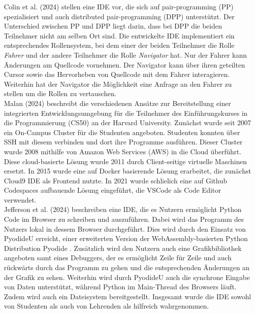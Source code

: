 Colin et al. (2024)
stellen eine IDE vor, die sich auf pair-programming (PP) spezialisiert und auch distributed pair-programming (DPP) unterstützt. Der Unterschied zwischen PP und DPP liegt darin, dass bei DPP die beiden Teilnehmer nicht am selben Ort sind. Die entwickelte IDE implementiert ein entsprechendes Rollensystem, bei dem einer der beiden Teilnehmer die Rolle \textit{Fahrer} und der andere Teilnehmer die Rolle \textit{Navigator} hat. Nur der Fahrer kann Änderungen am Quellcode vornehmen. Der Navigator kann über ihren geteilten Cursor sowie das Hervorheben von Quellcode mit dem Fahrer interagieren. Weiterhin hat der Navigator die Möglichkeit eine Anfrage an den Fahrer zu stellen um die Rollen zu vertauschen. \\

Malan (2024)
beschreibt die verschiedenen Ansätze zur Bereitstellung einer integrierten Entwicklungsumgebung für die Teilnehmer des Einführungskurses in die Programmierung (CS50) an der Harvard University. Zunächst wurde seit 2007 ein On-Campus Cluster für die Studenten angeboten. Studenten konnten über SSH mit diesem verbinden und dort ihre Programme ausführen. Dieser Cluster wurde 2008 mithilfe von Amazon Web Services (AWS)
in die Cloud überführt. Diese cloud-basierte Lösung wurde 2011 durch Client-seitige virtuelle Maschinen ersetzt. In 2015 wurde eine auf Docker basierende Lösung erarbeitet, die zunächst Cloud9 IDE
als Frontend nutzte. In 2021 wurde schlielich eine auf Github Codespaces aufbauende Lösung eingeführt, die VSCode als Code Editor verwendet. \\

Jefferson et al. (2024) \cite{PyodideU-2024} beschreiben eine IDE, die es Nutzern ermöglicht Python Code im Browser zu schreiben und auszuführen. Dabei wird das Programm des Nutzers lokal in dessem Browser durchgeführt. Dies wird durch den Einsatz von PyodideU erreicht, einer erweiterten Version der WebAssembly-basierten Python Distribution Pyodide \cite{Pyodide}. Zusätzlich wird den Nutzern auch eine Grafikbibliothek angeboten samt eines Debuggers, der es ermöglicht Zeile für Zeile und auch rückwärts durch das Programm zu gehen und die entsprechenden Änderungen an der Grafik zu sehen. Weiterhin wird durch PyodideU auch die synchrone Eingabe von Daten unterstützt, während Python im Main-Thread des Browsers läuft. Zudem wird auch ein Dateisystem bereitgestellt. Insgesamt wurde die IDE sowohl von Studenten als auch von Lehrenden als hilfreich wahrgenommen. \\

